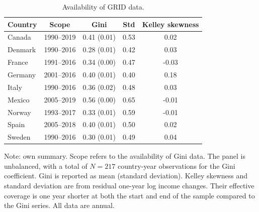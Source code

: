 \documentclass[12pt, a4paper]{article}
\begin{document}
\begin{table}[H]
\captionsetup{justification=raggedright, singlelinecheck=false}
\centering
\caption{Availability of GRID data.}
\small 
\setlength{\tabcolsep}{5pt} 
\renewcommand{\arraystretch}{0.95}
\begin{tabular}{l c c c c}
\toprule
Country & Scope & Gini & Std & Kelley skewness \\
\midrule
Canada   & 1990--2019 & 0.41 (0.01) & 0.53 & 0.02\\
Denmark  & 1990--2016 & 0.28 (0.01) & 0.42 & 0.03\\
France   & 1991--2016 & 0.34 (0.00) & 0.47 & -0.03\\
Germany  & 2001--2016 & 0.40 (0.01) & 0.40 & 0.18\\
Italy    & 1990--2016 & 0.36 (0.02) & 0.48 & 0.03\\
Mexico   & 2005--2019 & 0.56 (0.00) & 0.65 & -0.01\\
Norway   & 1993--2017 & 0.33 (0.01) & 0.59 & -0.01\\
Spain    & 2005--2018 & 0.40 (0.01) & 0.50 & 0.02\\
Sweden   & 1990--2016 & 0.30 (0.01) & 0.49 & 0.04\\
\bottomrule
\end{tabular}

\vspace{0.1cm}
\parbox{0.9\linewidth}{\raggedright\footnotesize Note: own summary. Scope refers to the availability of Gini data. The panel is unbalanced, with a total of $N=217$ country-year observations for the Gini coefficient. Gini is reported as mean (standard deviation). Kelley skewness and standard deviation are from residual one-year log income changes. Their effective coverage is one year shorter at both the start and end of the sample compared to the Gini series. All data are annual.}
\label{table:a5}
\end{table}
\end{document}
